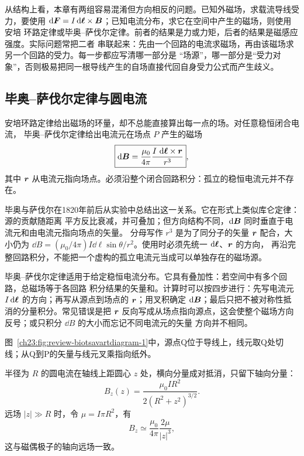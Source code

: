 {从结构上看，本章有两组容易混淆但方向相反的问题。已知外磁场，求载流导线受力，要使用
$\mathop{}\!\mathrm d\bm{F}=I\mathop{}\!\mathrm d\bm{\ell}\times\bm{B}$；已知电流分布，求它在空间中产生的磁场，则使用安培
环路定律或毕奥--萨伐尔定律。前者的结果是力或力矩，后者的结果是磁感应强度。实际问题常把二者
串联起来：先由一个回路的电流求磁场，再由该磁场求另一个回路的受力。每一步都应写清哪一部分是
“场源”，哪一部分是“受力对象”，否则极易把同一根导线产生的自场直接代回自身受力公式而产生歧义。


\subsection{毕奥--萨伐尔定律与圆电流}


安培环路定律给出磁场的环量，却不总能直接算出每一点的场。对任意稳恒闭合电流，
毕奥--萨伐尔定律给出电流元在场点 $P$ 产生的磁场
\begin{equation}
  \boxed{\mathop{}\!\mathrm d\bm{B}=\frac{\mu_0}{4\pi}
  \frac{I\,\mathop{}\!\mathrm d\bm{\ell}\times\bm{r}}{r^3}},
\end{equation}
其中 $\bm{r}$ 从电流元指向场点。必须沿整个闭合回路积分：孤立的稳恒电流元并不存在。

毕奥与萨伐尔在1820年前后从实验中总结出这一关系。它在形式上类似库仑定律：源的贡献随距离
平方反比衰减，并可叠加；但方向结构不同，$\mathop{}\!\mathrm d\bm{B}$ 同时垂直于电流元和由电流元指向场点的矢量。
分母写作 $r^3$ 是为了同分子的矢量 $\bm{r}$ 配合，大小仍为
$\dd B=(\mu_0/4\pi)I\dd\ell\sin\theta/r^2$。使用时必须先统一 $\mathop{}\!\mathrm d\bm{\ell}$、$\bm{r}$ 的方向，
再沿完整回路积分，不能把一个虚构的孤立电流元当成可以单独存在的磁场源。

毕奥--萨伐尔定律适用于给定稳恒电流分布。它具有叠加性：若空间中有多个回路，总磁场等于各回路
积分结果的矢量和。计算时可以按四步进行：先写电流元 $I\mathop{}\!\mathrm d\bm{\ell}$ 的方向；再写从源点到场点的
$\bm{r}$；用叉积确定 $\mathop{}\!\mathrm d\bm{B}$；最后只把不被对称性抵消的分量积分。常见错误是把 $\bm{r}$
反向写成从场点指向源点，这会使整个磁场方向反号；或只积分 $\dd B$ 的大小而忘记不同电流元的矢量
方向并不相同。

图~\ref{ch23:fig:review-biotsavartdiagram-1}中，源点Q位于导线上，线元取Q处切线；从Q到P的矢量与线元叉乘指向纸外。
\par\noindent\begin{minipage}{\linewidth}
\biotSavartDiagram
{}
\end{minipage}\par\medskip

半径为 $R$ 的圆电流在轴线上距圆心 $z$ 处，横向分量成对抵消，只留下轴向分量：
\begin{equation}
  \boxed{B_z(z)=\frac{\mu_0IR^2}{2(R^2+z^2)^{3/2}}}.
\end{equation}
远场 $|z|\gg R$ 时，令 $\mu=I\pi R^2$，有
\begin{equation}
  B_z\simeq\frac{\mu_0}{4\pi}\frac{2\mu}{|z|^3},
\end{equation}
这与磁偶极子的轴向远场一致。

}

